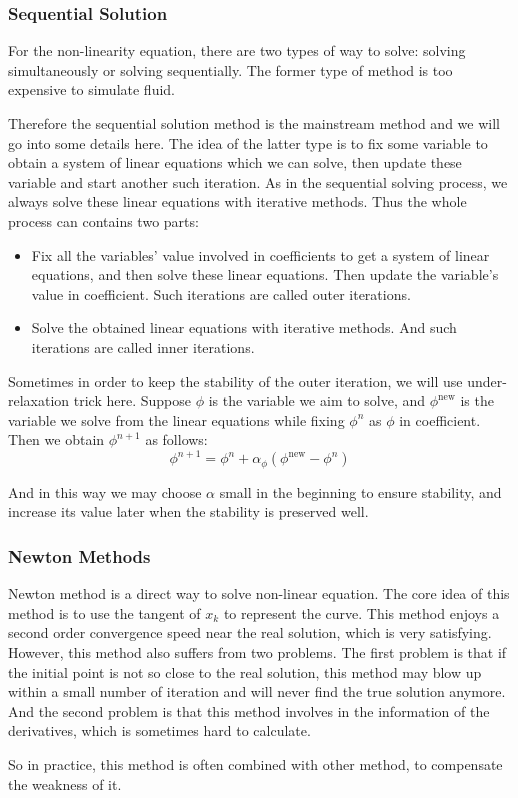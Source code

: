\documentclass[english, nochinese]{pkupaper}
\begin{document}
\subsubsection{Sequential Solution}
\par For the non-linearity equation, there are two types of way to solve: solving simultaneously or solving sequentially. The former type of method is too expensive to simulate fluid. 
\par Therefore the sequential solution method is the mainstream method and we will go into some details here. The idea of the latter type is to fix some variable to obtain a system of linear equations which we can solve, then update these variable and start another such iteration. As in the sequential solving process, we always solve these linear equations with iterative methods. Thus the whole process can contains two parts:
\begin{itemize}
	\item Fix all the  variables' value involved in coefficients to get a system of linear equations, and then solve these linear equations. Then update the variable's value in coefficient. Such iterations are called outer iterations.
	\item Solve the obtained linear equations with iterative methods. And such iterations are called inner iterations.
\end{itemize}
\par Sometimes in order to keep the stability of the outer iteration, we will use under-relaxation trick here. Suppose $\phi$ is the variable we aim to solve, and $\phi^{\mathrm{new}}$ is the variable we solve from the linear equations while fixing $\phi^n$ as $\phi$ in coefficient. Then we obtain $\phi^{n+1}$ as follows:
\begin{equation}
	\phi^{n+1} = \phi^n + \alpha_\phi(\phi^{\mathrm{new}} - \phi^n)
\end{equation}
\par And in this way we may choose $\alpha$ small in the beginning to ensure stability, and increase its value later when the stability is preserved well.

\subsubsection{Newton Methods}
\par Newton method is a direct way to solve non-linear equation. The core idea of this method is to use the tangent of $x_k$ to represent the curve. This method enjoys a second order convergence speed near the real solution, which is very satisfying. However, this method also suffers from two problems. The first problem is that if the initial point is not so close to the real solution, this method may blow up within a small number of iteration and will never find the true solution anymore. And the second problem is that this method involves in the information of the derivatives, which is sometimes hard to calculate.
\par So in practice, this method is often combined with other method, to compensate the weakness of it.
\end{document}
